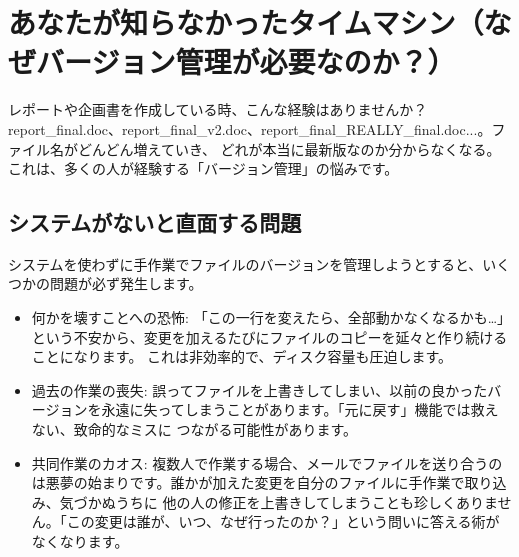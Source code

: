\documentclass{ltjsarticle}
\begin{document}
\section{あなたが知らなかったタイムマシン（なぜバージョン管理が必要なのか？）}
レポートや企画書を作成している時、こんな経験はありませんか？ report_final.doc、report_final_v2.doc、report_final_REALLY_final.doc...。ファイル名がどんどん増えていき、
どれが本当に最新版なのか分からなくなる。これは、多くの人が経験する「バージョン管理」の悩みです。

\subsection{システムがないと直面する問題}
システムを使わずに手作業でファイルのバージョンを管理しようとすると、いくつかの問題が必ず発生します。
\begin{itemize}
    \item 何かを壊すことへの恐怖: 「この一行を変えたら、全部動かなくなるかも…」という不安から、変更を加えるたびにファイルのコピーを延々と作り続けることになります。
    これは非効率的で、ディスク容量も圧迫します。
    \item 過去の作業の喪失: 誤ってファイルを上書きしてしまい、以前の良かったバージョンを永遠に失ってしまうことがあります。「元に戻す」機能では救えない、致命的なミスに
    つながる可能性があります。
    \item 共同作業のカオス: 複数人で作業する場合、メールでファイルを送り合うのは悪夢の始まりです。誰かが加えた変更を自分のファイルに手作業で取り込み、気づかぬうちに
    他の人の修正を上書きしてしまうことも珍しくありません。「この変更は誰が、いつ、なぜ行ったのか？」という問いに答える術がなくなります。
\end{itemize}
\end{document}
